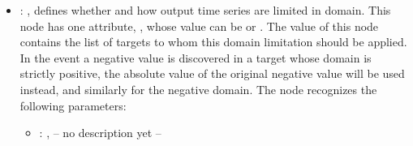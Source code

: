 \begin{itemize}
    \item {}: , 
      defines whether and how output                                                    time series
      are limited in domain. This node has one attribute, , whose value can be
       or . The value of this node contains the list of
      targets to whom                                                    this domain limitation
      should be applied. In the event a negative value is discovered in a target whose
      domain is strictly positive, the absolute value of the original negative value will be used
      instead, and                                                    similarly for the negative
      domain.
      The  node recognizes the following parameters:
        \begin{itemize}
          \item {}: , 
            -- no description yet --
      \end{itemize}
  \end{itemize}

